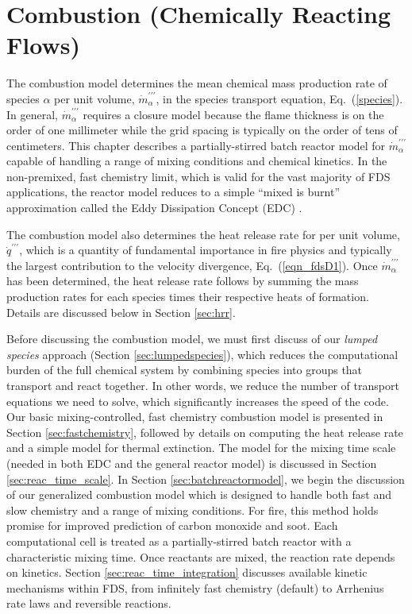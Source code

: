 
\chapter{Combustion (Chemically Reacting Flows)}
\label{chapter:combustion}

\label{combustionsection}
The combustion model determines the mean chemical mass production rate of species $\alpha$ per unit volume, $\dot{m}^{\prime\prime\prime}_{\alpha}$, in the species transport equation, Eq.~(\ref{species}).  In general, $\dot{m}^{\prime\prime\prime}_{\alpha}$ requires a closure model because the flame thickness is on the order of one millimeter while the grid spacing is typically on the order of tens of centimeters.  This chapter describes a partially-stirred batch reactor model for $\dot{m}^{\prime\prime\prime}_{\alpha}$ capable of handling a range of mixing conditions and chemical kinetics.  In the non-premixed, fast chemistry limit, which is valid for the vast majority of FDS applications, the reactor model reduces to a simple ``mixed is burnt'' approximation called the Eddy Dissipation Concept (EDC) \cite{Magnussen:1,Poinsot:TNC}.

The combustion model also determines the heat release rate for per unit volume, $\dot{q}^{\prime\prime\prime}$, which is a quantity of fundamental importance in fire physics and typically the largest contribution to the velocity divergence, Eq.~(\ref{eqn_fdsD1}).  Once $\dot{m}^{\prime\prime\prime}_{\alpha}$ has been determined, the heat release rate follows by summing the mass production rates for each species times their respective heats of formation.  Details are discussed below in Section \ref{sec:hrr}.

Before discussing the combustion model, we must first discuss of our \emph{lumped species} approach (Section \ref{sec:lumpedspecies}), which reduces the computational burden of the full chemical system by combining species into groups that transport and react together.  In other words, we reduce the number of transport equations we need to solve, which significantly increases the speed of the code.  Our basic mixing-controlled, fast chemistry combustion model is presented in Section \ref{sec:fastchemistry}, followed by details on computing the heat release rate and a simple model for thermal extinction. The model for the mixing time scale (needed in both EDC and the general reactor model) is discussed in Section \ref{sec:reac_time_scale}. In Section \ref{sec:batchreactormodel}, we begin the discussion of our generalized combustion model which is designed to handle both fast and slow chemistry and a range of mixing conditions.  For fire, this method holds promise for improved prediction of carbon monoxide and soot. Each computational cell is treated as a partially-stirred batch reactor with a characteristic mixing time.  Once reactants are mixed, the reaction rate depends on kinetics.  Section \ref{sec:reac_time_integration} discusses available kinetic mechanisms within FDS, from infinitely fast chemistry (default) to Arrhenius rate laws and reversible reactions.

